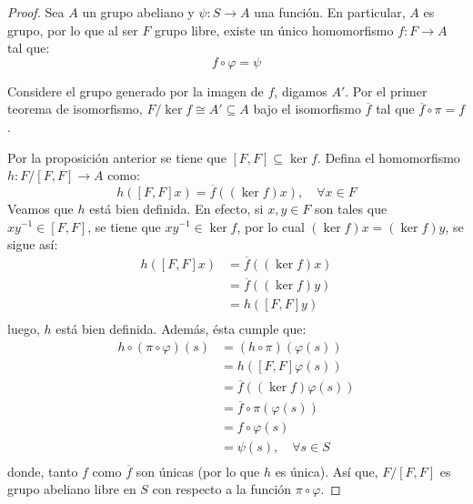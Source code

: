 \documentclass[12pt]{report}
\newcounter{it}
\theoremstyle{largebreak}
\newcommand\cf[3]{\ensuremath{#1:#2\rightarrow#3}}
\begin{document}
    \begin{proof}
        Sea $A$ un grupo abeliano y $\cf{\psi}{S}{A}$ una función. En particular, $A$ es grupo, por lo que al ser $F$ grupo libre, existe un único homomorfismo $\cf{f}{F}{A}$ tal que:
        \begin{equation*}
            f\circ\varphi=\psi
        \end{equation*}
    
        Considere el grupo generado por la imagen de $f$, digamos $A'$. Por el primer teorema de isomorfismo, $F/\ker f\cong A'\subseteq A $ bajo el isomorfismo $\overline{f}$ tal que $\overline{f}\circ\pi=f$.

        Por la proposición anterior se tiene que $[F,F]\subseteq\ker f$. Defina el homomorfismo $\cf{h}{F/[F,F]}{A}$ como:
        \begin{equation*}
            h\left([F,F]x\right)=\overline{f}((\ker f)x),\quad\forall x\in F
        \end{equation*}
        Veamos que $h$ está bien definida. En efecto, si $x,y\in F$ son tales que $xy^{-1}\in [F,F]$, se tiene que $xy^{-1}\in\ker f$, por lo cual $(\ker f)x=(\ker f)y$, se sigue así:
        \begin{equation*}
            \begin{split}
                h([F,F]x)&=\overline{f}((\ker f)x)\\
                &=\overline{f}((\ker f)y)\\
                &=h([F,F]y)\\
            \end{split}
        \end{equation*}
        luego, $h$ está bien definida. Además, ésta cumple que:
        \begin{equation*}
            \begin{split}
                h\circ(\pi\circ\varphi)(s)&=(h\circ\pi)(\varphi(s))\\
                &=h([F,F]\varphi(s))\\
                &=\overline{f}((\ker f)\varphi(s))\\
                &=\overline{f}\circ\pi(\varphi(s))\\
                &=f\circ\varphi(s)\\
                &=\psi(s),\quad\forall s\in S \\
            \end{split}
        \end{equation*}
        donde, tanto $f$ como $\overline{f}$ son únicas (por lo que $h$ es única). Así que, $F/[F,F]$ es grupo abeliano libre en $S$ con respecto a la función $\pi\circ\varphi$.
    \end{proof}
\end{document}
